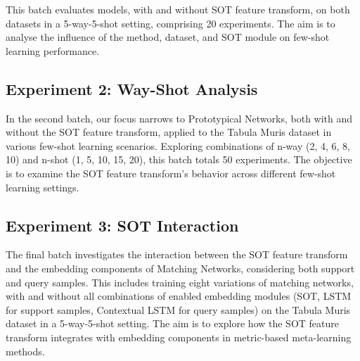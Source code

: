 This batch evaluates models, with and without SOT feature transform, on both datasets in a 5-way-5-shot setting, comprising 20 experiments. The aim is to analyse the influence of the method, dataset, and SOT module on few-shot learning performance.

\subsection{Experiment 2: Way-Shot Analysis}

In the second batch, our focus narrows to Prototypical Networks, both with and without the SOT feature transform, applied to the Tabula Muris dataset in various few-shot learning scenarios. Exploring combinations of n-way ({2, 4, 6, 8, 10}) and n-shot ({1, 5, 10, 15, 20}), this batch totals 50 experiments. The objective is to examine the SOT feature transform's behavior across different few-shot learning settings.

\subsection{Experiment 3: SOT Interaction} 

The final batch investigates the interaction between the SOT feature transform and the embedding components of Matching Networks, considering both support and query samples. This includes training eight variations of matching networks, with and without all combinations of enabled embedding modules (SOT, LSTM for support samples, Contextual LSTM for query samples) on the Tabula Muris dataset in a 5-way-5-shot setting. The aim is to explore how the SOT feature transform integrates with embedding components in metric-based meta-learning methods.